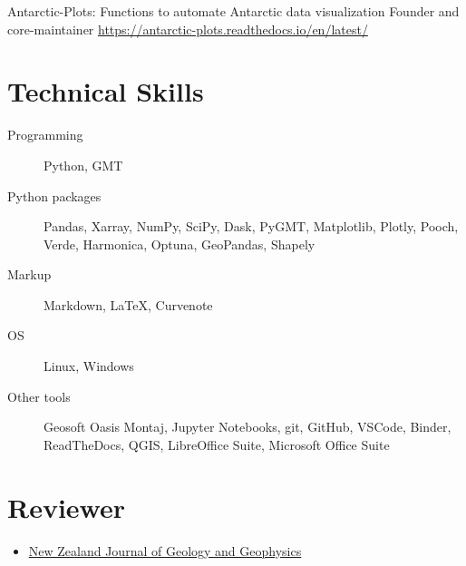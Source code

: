 \documentclass{ExpressiveResume}
\begin{document}
\begin{cventries}
    {Antarctic-Plots: Functions to automate Antarctic data visualization}
    {Founder and core-maintainer \newline \url{https://antarctic-plots.readthedocs.io/en/latest/}}
\end{cventries}


\section{Technical Skills}

\begin{description}
    \item[Programming] Python, GMT
    \item[Python packages] Pandas, Xarray, NumPy, SciPy, Dask, PyGMT,
        Matplotlib, Plotly, Pooch, Verde, Harmonica, Optuna, GeoPandas, Shapely
    \item[Markup] Markdown, \LaTeX, Curvenote
    \item[OS] Linux, Windows
    \item[Other tools] Geosoft Oasis Montaj, Jupyter Notebooks, git, GitHub, VSCode, Binder,
    ReadTheDocs, QGIS, LibreOffice Suite, Microsoft Office Suite
\end{description}


\section{Reviewer}

\begin{itemize}[label={}, leftmargin=*]
    \item \href{https://www.tandfonline.com/toc/tnzg20/current}{New
              Zealand Journal of Geology and Geophysics}
\end{itemize}
\end{document}
